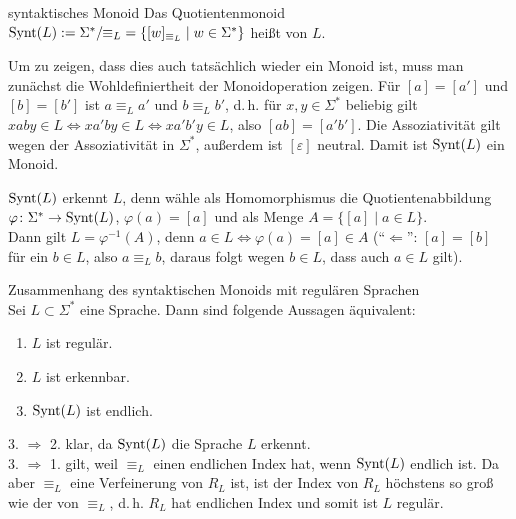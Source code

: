 \begin{Def}{syntaktisches Monoid}
    Das Quotientenmonoid $\text{Synt}(L) := \Sigma^\ast/\!\!\equiv_L \;=
    \{[w]_{\equiv_L} \;|\; w \in \Sigma^\ast\}$ heißt
     von $L$.
\end{Def}

\begin{Bem}
    Um zu zeigen, dass dies auch tatsächlich wieder ein Monoid ist,
    muss man zunächst die Wohldefiniertheit der Monoidoperation zeigen.
    Für $[a] = [a']$ und $[b] = [b']$ ist
    $a \equiv_L a'$ und $b \equiv_L b'$, d.\,h.
    für $x, y \in \Sigma^\ast$ beliebig gilt
    $x ab y \in L \iff x a'b y \in L \iff x a'b' y \in L$,
    also $[ab] = [a'b']$.
    Die Assoziativität gilt wegen der Assoziativität in $\Sigma^\ast$,
    außerdem ist $[\varepsilon]$ neutral.
    Damit ist $\text{Synt}(L)$ ein Monoid.
\end{Bem}

\begin{Bem}
    $\text{Synt}(L)$ erkennt $L$, denn
    wähle als Homomorphismus die Quotientenabbildung
    $\varphi\colon \Sigma^\ast \rightarrow \text{Synt}(L)$,
    $\varphi(a) = [a]$ und als Menge $A = \{[a] \;|\; a \in L\}$.\\
    Dann gilt $L = \varphi^{-1}(A)$, denn
    $a \in L \iff \varphi(a) = [a] \in A$
    ("`$\Leftarrow$"':
    $[a] = [b]$ für ein $b \in L$,
    also $a \equiv_L b$, daraus folgt wegen $b \in L$, dass auch $a \in L$
    gilt).
\end{Bem}

\linie

\begin{Satz}{Zusammenhang des syntaktischen Monoids mit regulären Sprachen}\\
    Sei $L \subset \Sigma^\ast$ eine Sprache.
    Dann sind folgende Aussagen äquivalent:
    \begin{enumerate}
        \item
        $L$ ist regulär.

        \item
        $L$ ist erkennbar.

        \item
        $\text{Synt}(L)$ ist endlich.
    \end{enumerate}
\end{Satz}

\begin{Beweis}
    3. $\Rightarrow$ 2. klar, da $\text{Synt}(L)$ die Sprache $L$ erkennt.\\
    3. $\Rightarrow$ 1. gilt, weil
    $\equiv_L$ einen endlichen Index hat, wenn $\text{Synt}(L)$ endlich ist.
    Da aber $\equiv_L$ eine Verfeinerung von $R_L$ ist, ist der Index von
    $R_L$ höchstens so groß wie der von $\equiv_L$, d.\,h.
    $R_L$ hat endlichen Index und somit ist $L$ regulär.
\end{Beweis}

